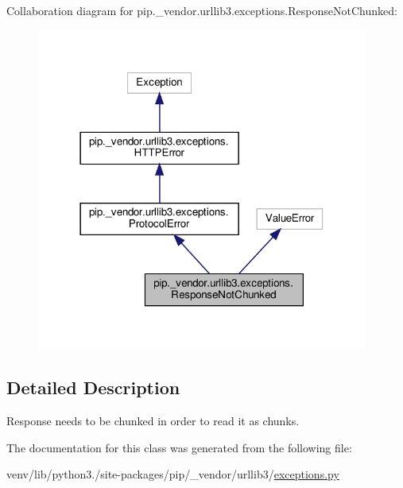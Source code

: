 Collaboration diagram for pip.\+\_\+vendor.\+urllib3.\+exceptions.\+Response\+Not\+Chunked\+:
\nopagebreak
\begin{figure}[H]
\begin{center}
\leavevmode
\includegraphics[width=309pt]{classpip_1_1__vendor_1_1urllib3_1_1exceptions_1_1ResponseNotChunked__coll__graph}
\end{center}
\end{figure}


\subsection{Detailed Description}
\begin{DoxyVerb}Response needs to be chunked in order to read it as chunks.\end{DoxyVerb}
 

The documentation for this class was generated from the following file\+:\begin{DoxyCompactItemize}
\item 
venv/lib/python3./site-\/packages/pip/\+\_\+vendor/urllib3/\hyperlink{pip_2__vendor_2urllib3_2exceptions_8py}{exceptions.\+py}\end{DoxyCompactItemize}
